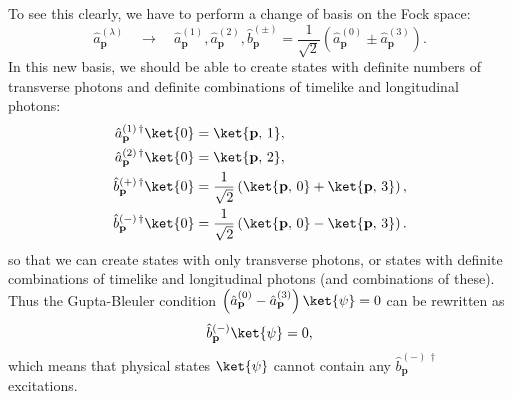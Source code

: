 To see this clearly, we have to perform a change of basis on the Fock space:
\[
    \hat{a}^{(\lambda)}_{\mathbf{p}} \quad \longrightarrow \quad \hat{a}^{(1)}_{\mathbf{p}}, \hat{a}^{(2)}_{\mathbf{p}}, \hat{b}^{(\pm)}_{\mathbf{p}} = \frac{1}{\sqrt{2}} \left( \hat{a}^{(0)}_{\mathbf{p}} \pm \hat{a}^{(3)}_{\mathbf{p}} \right).
\]
In this new basis, we should be able to create states with definite numbers of transverse photons and definite combinations of timelike and longitudinal photons:
\[
    \begin{aligned}
        \hat{a}^{(1)\,\dagger}_{\mathbf{p}} \ket{0} & = \ket{\mathbf{p},\, 1},                                                           \\
        \hat{a}^{(2)\,\dagger}_{\mathbf{p}} \ket{0} & = \ket{\mathbf{p},\, 2},                                                           \\
        \hat{b}^{(+)\,\dagger}_{\mathbf{p}} \ket{0} & = \frac{1}{\sqrt{2}} \left( \ket{\mathbf{p},\, 0} + \ket{\mathbf{p},\, 3} \right), \\
        \hat{b}^{(-)\,\dagger}_{\mathbf{p}} \ket{0} & = \frac{1}{\sqrt{2}} \left( \ket{\mathbf{p},\, 0} - \ket{\mathbf{p},\, 3} \right).
    \end{aligned}
\]
so that we can create states with only transverse photons, or states with definite combinations of timelike and longitudinal photons (and combinations of these). Thus the Gupta-Bleuler condition \(\left( \hat{a}^{(0)}_{\mathbf{p}} -  \hat{a}^{(3)}_{\mathbf{p}} \right) \ket{\psi} = 0\) can be rewritten as
\[
    \hat{b}^{(-)}_{\mathbf{p}} \ket{\psi} = 0,
\]
which means that physical states \(\ket{\psi}\) cannot contain any \(\hat{b}^{(-)\,\dagger}_{\mathbf{p}}\) excitations.

